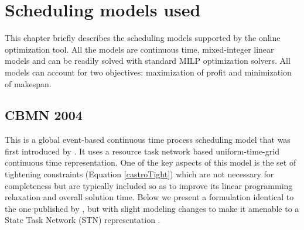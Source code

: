 \chapter{Scheduling models used}
\thispagestyle{plain}

This chapter briefly describes the scheduling models supported by the online optimization tool. All the models are continuous time, mixed-integer linear models and can be readily solved with standard MILP optimization solvers. All models can account for two objectives: maximization of profit and minimization of makespan.

\section{CBMN 2004}
This is a global event-based continuous time process scheduling model that was first introduced by \cite{Castro}. It uses a resource task network based uniform-time-grid continuous time representation. One of the key aspects of this model is the set of tightening constraints (Equation \ref{castroTight}) which are not necessary for completeness but are typically included so as to improve its linear programming relaxation and overall solution time. Below we present a formulation identical to the one published by \cite{Castro}, but with slight modeling changes to make it amenable to a State Task Network (STN) representation \citep{lappas}. 

